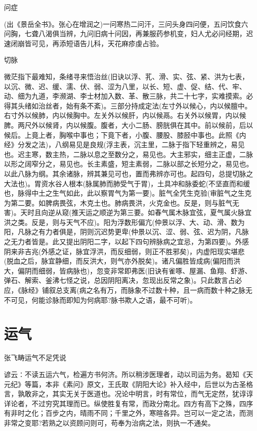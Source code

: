 \documentclass[a4paper,12pt,UTF8,twoside]{ctexbook}
\begin{document}
	问症

	(出《景岳全书》。张心在增润之)一问寒热二问汗，三问头身四问便，五问饮食六问胸，七聋八渴俱当辨，九问旧病十问因，再兼服药参机变，妇人尤必问经期，迟速闭崩皆可见，再添短语告儿科，天花麻疹虔占验。
		
	切脉

	微茫指下最难知，条绪寻来悟治丝(旧诀以浮、芤、滑、实、弦、紧、洪为七表，以沉、微、迟、缓、濡、伏、弱、涩为八里，以长、短、虚、促、结、代、牢、动、细为九道，李濒湖、李士材加入数、革、散三脉，共二十七字，实难摸索。必得其头绪如治丝者，始有条不紊)。三部分持成定法(左寸外以候心，内以候膻中。右寸外以候肺，内以候胸中。左关外以候肝，内以候鬲。右关外以候胃，内以候脾。两尺外以候肾，内以候腹。腹者，大小二肠、膀胱俱在其中。前以候前，后以候后。上竟上者，胸喉中事也；下竟下者，小腹、腰股、膝胫中事也。此照《内经》分发之法)，八纲易见是良规(浮主表，沉主里，二脉于指下轻重辨之，易见也。迟主寒，数主热，二脉以息之至数分之，易见也。大主邪实，细主正虚，二脉以形之阔窄分之，易见也。长主素盛，短主素弱，二脉以部之长短分之，易见也。以此八脉为纲。其余诸脉，辨其兼见可也，置而弗辨亦可也。起四句，总提切脉之大法也)。胃资水谷人根本(脉属肺而肺受气于胃)，土具冲和脉委蛇(不坚直而和缓也，脉得中土之生气如此，此以察胃气为第一要)。脏气全凭生克验(审脏气之生克为第二要。如脾病畏弦，木克土也。肺病畏洪，火克金也。反是，则与脏气无害)。天时且向逆从窥(推天运之顺逆为第三要。如春气属木脉宜弦，夏气属火脉宜洪之类。反是，则与天气不应)。阳为浮数形偏亢(仲景以浮、大、动、滑、数为阳，凡脉之有力者俱是，阴则沉迟势更卑(仲景以沉、涩、弱、弦、迟为阴，凡脉之无力者皆是。此又提出阴阳二字，以起下四句辨脉病之宜忌，为第四要)。外感阴来非吉兆(外感之证，脉宜浮洪，而反细弱，则正不胜邪矣)，内虚阳现实堪悲(脱血之后，脉宜静细，而反洪大，则气亦外脱矣)。诸凡偏胜皆成病(偏阳而洪大，偏阴而细弱，皆病脉也)，忽变非常即弗医(旧诀有雀啄、屋漏、鱼翔、虾游、弹石、解索、釜沸七怪之说，总因阴阳离决，忽现出反常之象)。只此数言占必应，《脉经》铺叙总支离(病之名有万，而脉象不过数十种，且一病而数十种之脉无不可见，何能诊脉而即知为何病耶?脉书欺人之语，最不可听)。
	
	\chapter{运气}
	张飞畴运气不足凭说

	谚云∶不读五运六气，检遍方书何济。所以稍涉医理者，动以司运为务。曷知《天元纪》等篇，本非《素问》原文，王氏取《阴阳大论》补入经中，后世以为古圣格言，孰敢非之，其实无关于医道也。况论中明言，时有常位，而气无定然，犹谆谆详论者，不过穷究其理而已。纵使胜复有常，而政分南北。四方有高下之殊，四序有非时之化；百步之内，晴雨不同；千里之外，寒暄各异。岂可以一定之法，而测非常之变耶?若熟之以资顾问则可，苟奉为治病之法，则执一不通矣。
\end{document}
